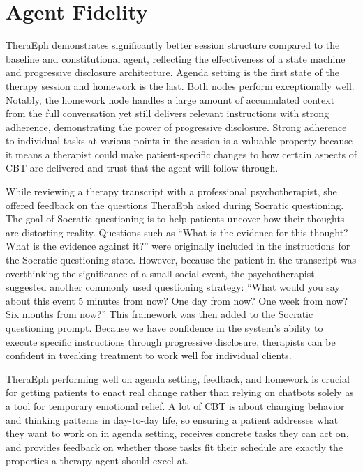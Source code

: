 \documentclass[twoside]{report}
\begin{document}
\section{Agent Fidelity}
TheraEph demonstrates significantly better session structure compared to the baseline and constitutional agent, reflecting the effectiveness of a state machine and progressive disclosure architecture. Agenda setting is the first state of the therapy session and homework is the last. Both nodes perform exceptionally well. Notably, the homework node handles a large amount of accumulated context from the full conversation yet still delivers relevant instructions with strong adherence, demonstrating the power of progressive disclosure. Strong adherence to individual tasks at various points in the session is a valuable property because it means a therapist could make patient-specific changes to how certain aspects of CBT are delivered and trust that the agent will follow through.

While reviewing a therapy transcript with a professional psychotherapist, she offered feedback on the questions TheraEph asked during Socratic questioning. The goal of Socratic questioning is to help patients uncover how their thoughts are distorting reality. Questions such as ``What is the evidence for this thought? What is the evidence against it?'' were originally included in the instructions for the Socratic questioning state. However, because the patient in the transcript was overthinking the significance of a small social event, the psychotherapist suggested another commonly used questioning strategy: ``What would you say about this event 5 minutes from now? One day from now? One week from now? Six months from now?'' This framework was then added to the Socratic questioning prompt. Because we have confidence in the system's ability to execute specific instructions through progressive disclosure, therapists can be confident in tweaking treatment to work well for individual clients.

TheraEph performing well on agenda setting, feedback, and homework is crucial for getting patients to enact real change rather than relying on chatbots solely as a tool for temporary emotional relief. A lot of CBT is about changing behavior and thinking patterns in day-to-day life, so ensuring a patient addresses what they want to work on in agenda setting, receives concrete tasks they can act on, and provides feedback on whether those tasks fit their schedule are exactly the properties a therapy agent should excel at.
\end{document}
